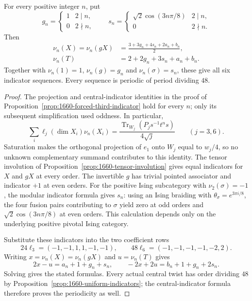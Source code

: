 \begin{theorem}
\label{thm:1660-all-indicators}
For every positive integer $n$, put
\[
 g_n=\begin{cases}1&2\mid n,\\0&2\nmid n,\end{cases}
 \qquad
 s_n=\begin{cases}\sqrt2\cos(3n\pi/8)&2\mid n,\\0&2\nmid n.\end{cases}
\]
Then
\begin{align*}
 \nu_n(X)=\nu_n(gX)&=\frac{3+3g_n+4s_n+2a_n+b_n}{2},\\
 \nu_n(T)&=2+2g_n+3s_n+a_n+b_n.
\end{align*}
Together with $\nu_n(1)=1$, $\nu_n(g)=g_n$ and
$\nu_n(\sigma)=s_n$, these give all six indicator sequences.
Every sequence is periodic of period dividing $48$.
\end{theorem}
\begin{proof}
The projection and central-indicator identities in the proof of
Proposition~\ref{prop:1660-forced-third-indicator} hold for every $n$;
only its subsequent simplification used oddness. In particular,
\[
 \sum_i\ell_j(\dim X_i)\nu_n(X_i)
 =\frac{\operatorname{Tr}_{W_j}(P_js^{-1}t^ns)}{4\sqrt j}
 \qquad(j=3,6).
\]
Saturation makes the orthogonal projection of $e_1$ onto $W_j$ equal to
$w_j/4$, so no unknown complementary summand contributes to this identity.
The tensor involution of Proposition~\ref{prop:1660-tensor-involution}
gives equal indicators for $X$ and $gX$ at every order.
The invertible $g$ has trivial pointed associator and indicator $+1$
at even orders. For the positive Ising subcategory with
$\nu_2(\sigma)=-1$, the modular indicator formula
\cite[Theorem~7.5]{NS} gives $s_n$: using an Ising braiding with
$\theta_\sigma=e^{3\pi i/8}$, the four fusion pairs contributing to
$\sigma$ yield zero at odd orders and
$\sqrt2\cos(3n\pi/8)$ at even orders. This calculation depends only on
the underlying positive pivotal Ising category.

Substitute these indicators into the two coefficient rows
\[
 24\ell_3=(-1,-1,1,1,-1,-1),\qquad
 48\ell_6=(-1,-1,-1,-1,-2,2).
\]
Writing $x=\nu_n(X)=\nu_n(gX)$ and $u=\nu_n(T)$ gives
\[
 2x-u=a_n+1+g_n+s_n,\qquad
 -2x+2u=b_n+1+g_n+2s_n.
\]
Solving gives the stated formulas. Every actual central twist has order
dividing $48$ by Proposition~\ref{prop:1660-uniform-indicators}; the
central-indicator formula therefore proves the periodicity as well.
\end{proof}

